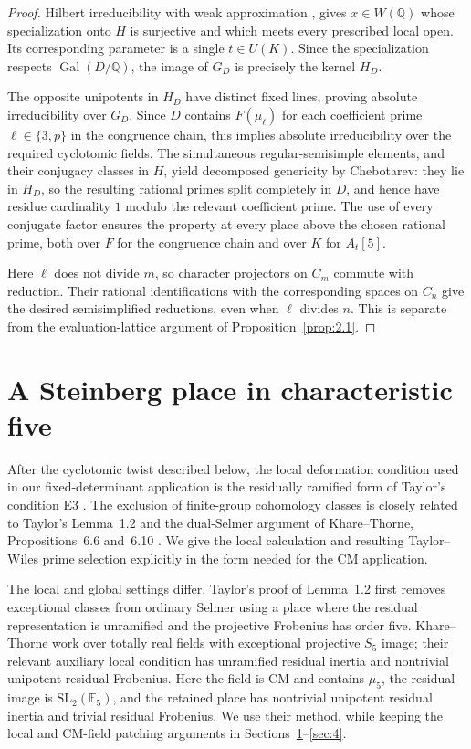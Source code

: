 \documentclass[11pt,a4paper]{article}
\numberwithin{equation}{section}
\begin{document}
\begin{proof}
Hilbert irreducibility with weak approximation \cite[Proposition~3.3.1 and Theorem~3.5.3]{SG}, \cite[Lemma~8.3]{O} gives \(x\in W(\mathbb Q)\) whose specialization onto \(H\) is surjective and which meets every prescribed local open. Its corresponding parameter is a single \(t\in U(K)\). Since the specialization respects \(\operatorname{Gal}(D/\mathbb Q)\), the image of \(G_D\) is precisely the kernel \(H_D\).

The opposite unipotents in \(H_D\) have distinct fixed lines, proving absolute irreducibility over \(G_D\). Since \(D\) contains \(F(\mu_\ell)\) for each coefficient prime \(\ell\in\{3,p\}\) in the congruence chain, this implies absolute irreducibility over the required cyclotomic fields. The simultaneous regular-semisimple elements, and their conjugacy classes in \(H\), yield decomposed genericity by Chebotarev: they lie in \(H_D\), so the resulting rational primes split completely in \(D\), and hence have residue cardinality \(1\) modulo the relevant coefficient prime. The use of every conjugate factor ensures the property at every place above the chosen rational prime, both over \(F\) for the congruence chain and over \(K\) for \(A_t[5]\).

Here \(\ell\) does not divide \(m\), so character projectors on \(C_m\) commute with reduction. Their rational identifications with the corresponding spaces on \(C_n\) give the desired semisimplified reductions, even when \(\ell\) divides \(n\). This is separate from the evaluation-lattice argument of Proposition~\ref{prop:2.1}.
\end{proof}


\section{A Steinberg place in characteristic five}
\label{sec:3}

After the cyclotomic twist described below, the local deformation condition used in our fixed-determinant application is the residually ramified form of Taylor's condition E3 \cite[\S1, condition E3]{Tay03}. The exclusion of finite-group cohomology classes is closely related to Taylor's Lemma~1.2 \cite{Tay03} and the dual-Selmer argument of Khare--Thorne, Propositions~6.6 and~6.10 \cite{KT}. We give the local calculation and resulting Taylor--Wiles prime selection explicitly in the form needed for the CM application.

The local and global settings differ. Taylor's proof of Lemma~1.2 first removes exceptional classes from ordinary Selmer using a place where the residual representation is unramified and the projective Frobenius has order five. Khare--Thorne work over totally real fields with exceptional projective \(S_5\) image; their relevant auxiliary local condition has unramified residual inertia and nontrivial unipotent residual Frobenius. Here the field is CM and contains \(\mu_5\), the residual image is \(\mathrm{SL}_2(\mathbb F_5)\), and the retained place has nontrivial unipotent residual inertia and trivial residual Frobenius. We use their method, while keeping the local and CM-field patching arguments in Sections~\ref{sec:3}--\ref{sec:4}.
\end{document}
